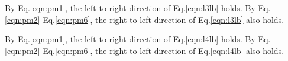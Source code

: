 By Eq.\eqref{eqn:pm1}, the left to right direction of 
Eq.\eqref{eqn:l3lb} holds. By Eq.\eqref{eqn:pm2}-Eq.\eqref{eqn:pm6}, the right to left 
direction of Eq.\eqref{eqn:l3lb} also holds.

By Eq.\eqref{eqn:pm1}, the left to right direction of 
Eq.\eqref{eqn:l4lb} holds. By Eq.\eqref{eqn:pm2}-Eq.\eqref{eqn:pm6}, the right to left 
direction of Eq.\eqref{eqn:l4lb} also holds.